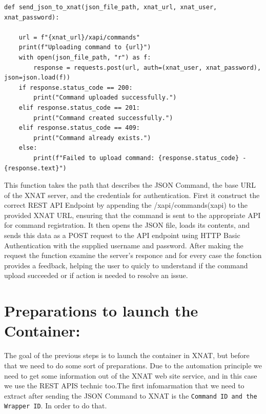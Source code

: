 \begin{lstlisting}
def send_json_to_xnat(json_file_path, xnat_url, xnat_user, xnat_password): 

    url = f"{xnat_url}/xapi/commands"
    print(f"Uploading command to {url}")
    with open(json_file_path, "r") as f:
        response = requests.post(url, auth=(xnat_user, xnat_password), json=json.load(f))
    if response.status_code == 200:
        print("Command uploaded successfully.")
    elif response.status_code == 201:
        print("Command created successfully.")
    elif response.status_code == 409:
        print("Command already exists.")
    else:
        print(f"Failed to upload command: {response.status_code} - {response.text}")

\end{lstlisting}

This function takes the path that describes the JSON Command, the base URL of the XNAT server, and the credentials for authentication. First it construct the correct REST API Endpoint by appending the /xapi/commands(xapi) to the provided XNAT URL, ensuring that the command is sent to the appropriate API for command registration. It then opens the JSON file, loads its contents, and sends this data as a POST request to the API endpoint using HTTP Basic Authentication with the supplied username and password. After making the request the function examine the server's responce and for every case the fonction provides a feedback, helping the user to quicly to understand if the command upload succeeded or if action is needed to resolve an issue. 

\section{Preparations to launch the Container:}
The goal of the previous steps is to launch the container in XNAT, but before that we need to do some sort of preparations. Due to the automation principle we need to get some information out of the XNAT web site service, and in this case we use the REST APIS technic too.The first infomarmation that we need to extract after sending the JSON Command to XNAT is the \texttt{Command ID and the Wrapper ID}.
In order to do that. 
 

